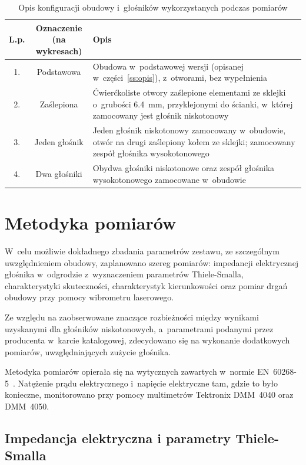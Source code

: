 \documentclass[12pt]{oska}
\begin{document}
	\begin{table}[!ht]
		\centering
		\caption{Opis konfiguracji obudowy i~głośników wykorzystanych podczas pomiarów}
		\label{t:obudowa}
		\begin{tabular}{|c|c|m{}|}
			\hline
			\textbf{L.p.} & \makecell{\textbf{Oznaczenie}\\\textbf{(na wykresach)}} & \centering\textbf{Opis} \tabularnewline\hline
			1. & Podstawowa & Obudowa w~podstawowej wersji (opisanej w~części~\ref{ss:opis}), z~otworami, bez wypełnienia \\\hline
			2. & Zaślepiona & Ćwierćkoliste otwory zaślepione elementami ze sklejki o~grubości \SI{6,4}{\milli\metre}, przyklejonymi do ścianki, w~której zamocowany jest głośnik niskotonowy\\\hline
			\hline
			3. & Jeden głośnik & Jeden głośnik niskotonowy zamocowany w~obudowie, otwór na drugi zaślepiony kołem ze sklejki; zamocowany zespół głośnika wysokotonowego \\\hline
			4. & Dwa głośniki & Obydwa głośniki niskotonowe oraz zespół głośnika wysokotonowego zamocowane w~obudowie\\\hline
		\end{tabular}
	\end{table}
	
	\section{Metodyka pomiarów}
	
	W~celu możliwie dokładnego zbadania parametrów zestawu, ze szczególnym uwzględnieniem obudowy, zaplanowano szereg pomiarów: impedancji elektrycznej głośnika w~odgrodzie z~wyznaczeniem parametrów Thiele-Smalla, charakterystyki skuteczności, charakterystyk kierunkowości oraz pomiar drgań obudowy przy pomocy wibrometru laserowego.
	
	Ze względu na zaobserwowane znaczące rozbieżności między wynikami uzyskanymi dla głośników niskotonowych, a~parametrami podanymi przez producenta w~karcie katalogowej, zdecydowano się na wykonanie dodatkowych pomiarów, uwzględniających zużycie głośnika.
	
	Metodyka pomiarów opierała się na wytycznych zawartych w~normie EN~60268-5~\cite{norma}. Natężenie prądu elektrycznego i~napięcie elektryczne tam, gdzie to było konieczne, monitorowano przy pomocy multimetrów Tektronix DMM~4040 oraz DMM~4050.
	
	\subsection{Impedancja elektryczna i parametry Thiele-Smalla}
	
\end{document}
